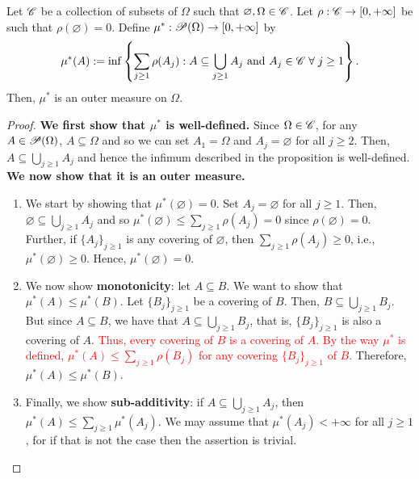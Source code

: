 \begin{proposition}
    Let $\mathscr{C}$ be a collection of subsets of $\Omega$ such that $\varnothing, \Omega \in \mathscr{C}$. Let $\rho: \mathscr{C} \to [0, +\infty]$ be such that $\rho(\varnothing) = 0$. Define $\mu^*: \mathscr{P}(\Omega) \to [0, +\infty]$ by
    \[
    \mu^*(A) := \inf\left\{ \sum_{j\geq 1} \rho(A_j) : A \subseteq \bigcup_{j \geq 1} A_j \text{ and } A_j \in \mathscr{C} \; \forall \; j \geq 1 \right\}.
    \]
    Then, $\mu^*$ is an outer measure on $\Omega$. 
\end{proposition}

\begin{proof}
    \textbf{We first show that $\mu^*$ is well-defined.} Since $\Omega \in \mathscr{C}$, for any $A \in \mathscr{P}(\Omega)$, $A \subseteq \Omega$ and so we can set $A_1 = \Omega$ and $A_j = \varnothing$ for all $j \geq 2$. Then, $A \subseteq \bigcup_{j \geq 1}A_j$ and hence the infimum described in the proposition is well-defined. \\
    
    \textbf{We now show that it is an outer measure.}
    
    \begin{enumerate}
        
        \item We start by showing that $\mu^*(\varnothing) = 0$. Set $A_j = \varnothing$ for all $j \geq 1$. Then, $\varnothing \subseteq \bigcup_{j \geq 1} A_j$ and so $\mu^*(\varnothing) \leq \sum_{j \geq 1} \rho(A_j) = 0$ since $\rho(\varnothing) = 0$. Further, if $\{A_j\}_{j \geq 1}$ is any covering of $\varnothing$, then $\sum_{j \geq 1} \rho(A_j) \geq 0$, i.e., $\mu^*(\varnothing) \geq 0$. Hence, $\mu^*(\varnothing) = 0$. 
        
        \item We now show \textbf{monotonicity}: let $A \subseteq B$. We want to show that $\mu^*(A) \leq \mu^*(B)$. Let $\{ B_j\}_{j \geq1} $ be a covering of $B$. Then, $B \subseteq \bigcup_{j \geq 1} B_j$. But since $A \subseteq B$, we have that $A \subseteq \bigcup_{j \geq 1} B_j$, that is, $\{ B_j \}_{j \geq 1}$ is also a covering of $A$. \textcolor{red}{Thus, every covering of $B$ is a covering of $A$. By the way $\mu^*$ is defined, $\mu^*(A) \leq \sum_{j \geq 1} \rho(B_j)$ for any covering $\{ B_j \}_{j \geq 1}$ of $B$.} Therefore, $\mu^*(A) \leq \mu^*(B)$.
        
        \item Finally, we show \textbf{sub-additivity}: if $A \subseteq \bigcup_{j \geq 1} A_j$, then $\mu^*(A) \leq \sum_{j \geq 1} \mu^*(A_j)$. We may assume that $\mu^*(A_j) < +\infty$ for all $j \geq 1$, for if that is not the case then the assertion is trivial.        
        

\end{enumerate}
\end{proof}
